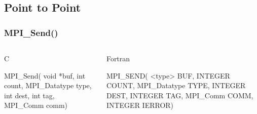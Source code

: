 \documentclass[handout]{beamer}
\begin{document}
\subsection{Point to Point}
\begin{frame}[fragile]
 \frametitle{MPI\_Send()}
   \begin{columns}[T]
    \begin{column}{5cm}
     \begin{block}{C}
      \begin{semiverbatim}
MPI\_Send( void  *buf,
           int count,
  MPI\_Datatype  type,
           int  dest,
           int   tag,
      MPI\_Comm   comm)
      \end{semiverbatim}
     \end{block}
    \end{column}
    \begin{column}{5cm}
     \begin{block}{Fortran}
      \begin{semiverbatim}
MPI\_SEND( <type>   BUF,
      INTEGER    COUNT,
 MPI\_Datatype     TYPE,
      INTEGER     DEST,
      INTEGER      TAG,
     MPI\_Comm     COMM,
      INTEGER    IERROR)
      \end{semiverbatim}
     \end{block}
    \end{column}
   \end{columns}
\end{frame}
\end{document}
